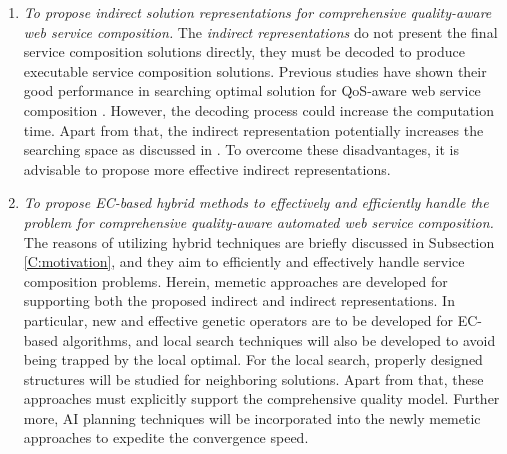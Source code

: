 \begin{enumerate}
\begin{enumerate}
     \item \emph{To propose indirect solution representations for comprehensive quality-aware web service composition.} The \emph{indirect representations} do not present the final service composition solutions directly, they must be decoded to produce executable service composition solutions. Previous studies have shown their good performance in searching optimal solution for QoS-aware web service composition \cite{da2016memetic,da2016particle}. However, the decoding process could increase the computation time. Apart from that, the indirect representation potentially increases the searching space as discussed in \cite{da2016particle}. To overcome these disadvantages, it is advisable to propose more effective indirect representations.
    
    \item \emph{To propose EC-based hybrid methods to effectively and efficiently handle the problem for comprehensive quality-aware automated web service composition.} The reasons of utilizing hybrid techniques are briefly discussed in Subsection \ref{C:motivation}, and they aim to efficiently and effectively handle service composition problems. Herein, memetic approaches are developed for supporting both the proposed indirect and indirect representations. In particular, new and effective genetic operators are to be developed for EC-based algorithms, and local search techniques will also be developed to avoid being trapped by the local optimal. For the local search, properly designed structures will be studied for neighboring solutions. Apart from that, these approaches must explicitly support the comprehensive quality model. Further more, AI planning techniques will be incorporated into the newly memetic approaches to expedite the convergence speed.
  \end{enumerate}
 

\end{enumerate}
